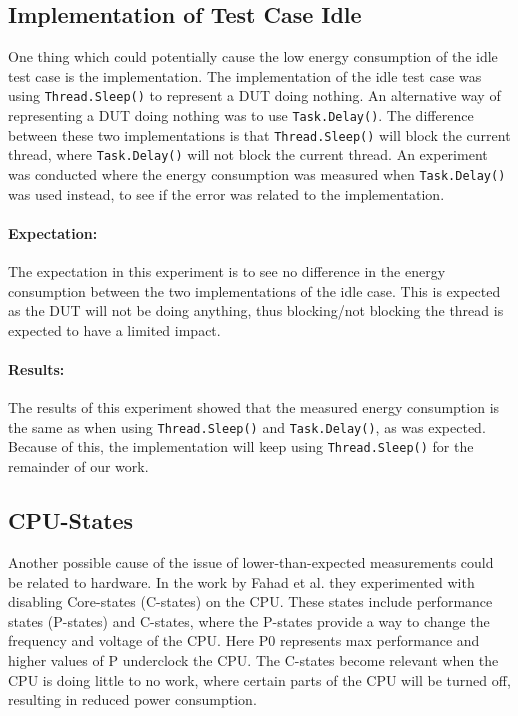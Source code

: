 \subsection{Implementation of Test Case Idle}

One thing which could potentially cause the low energy consumption of the idle test case is the implementation. The implementation of the idle test case was using \texttt{Thread.Sleep()} to represent a DUT doing nothing. An alternative way of representing a DUT doing nothing was to use \texttt{Task.Delay()}. The difference between these two implementations is that \texttt{Thread.Sleep()} will block the current thread, where \texttt{Task.Delay()} will not block the current thread. An experiment was conducted where the energy consumption was measured when \texttt{Task.Delay()} was used instead, to see if the error was related to the implementation.

\paragraph*{Expectation:} The expectation in this experiment is to see no difference in the energy consumption between the two implementations of the idle case. This is expected as the DUT will not be doing anything, thus blocking/not blocking the thread is expected to have a limited impact.

\paragraph*{Results:} The results of this experiment showed that the measured energy consumption is the same as when using \texttt{Thread.Sleep()} and \texttt{Task.Delay()}, as was expected. Because of this, the implementation will keep using \texttt{Thread.Sleep()} for the remainder of our work.

\subsection*{CPU-States}

Another possible cause of the issue of lower-than-expected measurements could be related to hardware. In the work by Fahad et al.\cite[]{fahad2019comparative} they experimented with disabling Core-states (C-states) on the CPU. These states include performance states (P-states) and C-states\cite[]{PCStat}, where the P-states provide a way to change the frequency and voltage of the CPU. Here P0 represents max performance and higher values of P underclock the CPU. The C-states become relevant when the CPU is doing little to no work, where certain parts of the CPU will be turned off, resulting in reduced power consumption. 


